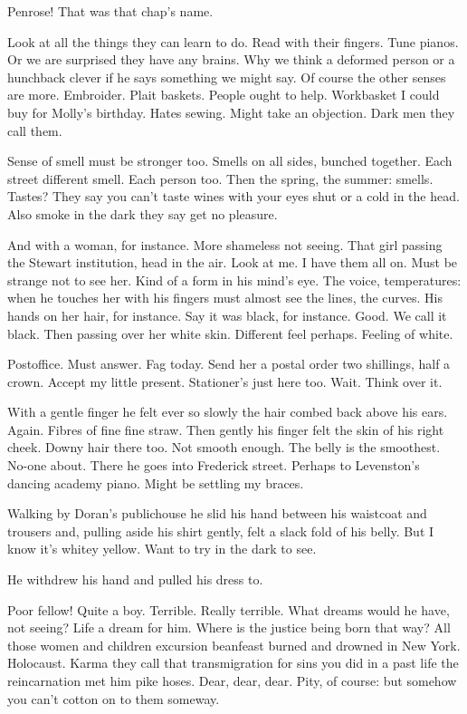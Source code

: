 Penrose!
That was that chap's name.

Look at all the things they can learn to do.
Read with their fingers.
Tune pianos.
Or we are surprised they have any brains.
Why we think a
deformed person or a hunchback clever if he says something we might say.
Of course the other senses are more.
Embroider.
Plait baskets.
People
ought to help.
Workbasket I could buy for Molly's birthday.
Hates sewing.
Might take an objection.
Dark men they call them.

Sense of smell must be stronger too.
Smells on all sides,
bunched
together.
Each street different smell.
Each person too.
Then the spring,
the summer:
smells.
Tastes?
They say you can't taste wines with your eyes
shut or a cold in the head.
Also smoke in the dark they say get no
pleasure.

And with a woman,
for instance.
More shameless not seeing.
That girl
passing the Stewart institution,
head in the air.
Look at me.
I have them
all on.
Must be strange not to see her.
Kind of a form in his mind's eye.
The voice,
temperatures:
when he touches her with his fingers must almost
see the lines,
the curves.
His hands on her hair,
for instance.
Say it
was black,
for instance.
Good.
We call it black.
Then passing over her
white skin.
Different feel perhaps.
Feeling of white.

Postoffice.
Must answer.
Fag today.
Send her a postal order two
shillings,
half a crown.
Accept my little present.
Stationer's just here
too.
Wait.
Think over it.

With a gentle finger he felt ever so slowly the hair combed back above
his ears.
Again.
Fibres of fine fine straw.
Then gently his finger felt
the skin of his right cheek.
Downy hair there too.
Not smooth enough.
The
belly is the smoothest.
No-one about.
There he goes into Frederick
street.
Perhaps to Levenston's dancing academy piano.
Might be settling
my braces.

Walking by Doran's publichouse he slid his hand between his waistcoat and
trousers and,
pulling aside his shirt gently,
felt a slack fold of his
belly.
But I know it's whitey yellow.
Want to try in the dark to see.

He withdrew his hand and pulled his dress to.

Poor fellow!
Quite a boy.
Terrible.
Really terrible.
What dreams would he
have,
not seeing?
Life a dream for him.
Where is the justice being born
that way?
All those women and children excursion beanfeast burned and
drowned in New York.
Holocaust.
Karma they call that transmigration for
sins you did in a past life the reincarnation met him pike hoses.
Dear,
dear,
dear.
Pity,
of course:
but somehow you can't cotton on to them
someway.

